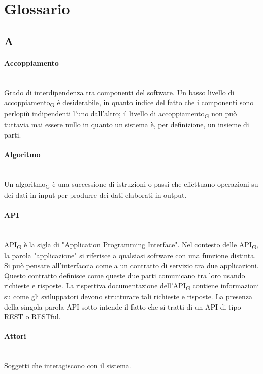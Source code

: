 \section{Glossario}
\subsection*{A}

\paragraph{Accoppiamento}~\smallskip \\
Grado di interdipendenza tra componenti del software. Un basso livello di accoppiamento\textsubscript{G} è desiderabile, in quanto indice del fatto che i componenti sono perlopiù indipendenti l'uno dall'altro; il livello di accoppiamento\textsubscript{G} non può tuttavia mai essere nullo in quanto un sistema è, per definizione, un insieme di parti.

\paragraph{Algoritmo}~\smallskip \\
Un algoritmo\textsubscript{G} è una successione di istruzioni o passi che effettuano operazioni su dei dati in input per produrre dei dati elaborati in output.

\paragraph{API}~\smallskip \\
API\textsubscript{G} è la sigla di "Application Programming Interface". Nel contesto delle API\textsubscript{G}, la parola "applicazione" si riferisce a qualsiasi software con una funzione distinta. Si può pensare all'interfaccia come a un contratto di servizio tra due applicazioni. Questo contratto definisce come queste due parti comunicano tra loro usando richieste e risposte. La rispettiva documentazione dell'API\textsubscript{G} contiene informazioni su come gli sviluppatori devono strutturare tali richieste e risposte.
La presenza della singola parola API sotto intende il fatto che si tratti di un API di tipo REST o RESTful.

\paragraph{Attori}~\smallskip \\
Soggetti che interagiscono con il sistema.
\newpage
{}
